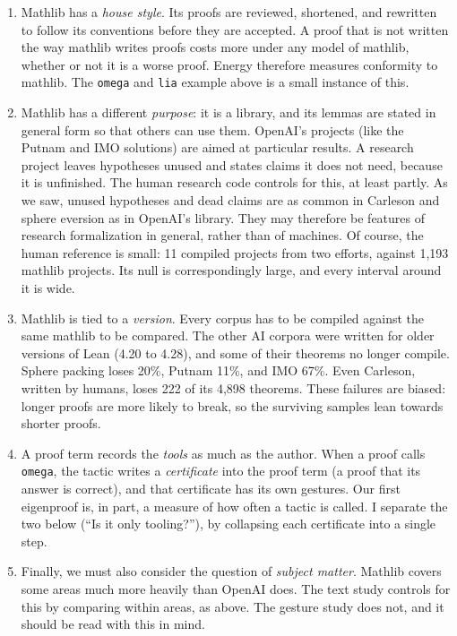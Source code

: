 \documentclass{article}
\begin{document}
\begin{enumerate}
     \item 
     Mathlib has a \textit{house style}. Its proofs are reviewed, shortened, and rewritten to follow its conventions
     before they are accepted. A proof that is not written the way mathlib writes proofs costs more under any model of
     mathlib, whether or not it is a worse proof. Energy therefore measures conformity to mathlib. 
     The \texttt{omega} and \texttt{lia} example above is a small instance of this.
     \item 
     Mathlib has a different \textit{purpose}: it is a library, and its lemmas are stated in general form so that others
     can use them. OpenAI's projects (like the Putnam and IMO solutions) are aimed at particular results. A research project
     leaves hypotheses unused and states claims it does not need, because it is unfinished.
     The human research code controls for this, at least partly. As we saw, unused hypotheses and dead claims are as common
     in Carleson and sphere eversion as in OpenAI's library. They may therefore be features of research formalization in
     general, rather than of machines. Of course, the human reference is small: 11 compiled projects from two efforts, against 1,193 mathlib
     projects. Its null is correspondingly large, and every interval around it is wide.
     \item
     Mathlib is tied to a \textit{version}. Every corpus has to be compiled against the same mathlib to be compared.
     The other AI corpora were written for older versions of Lean (4.20 to 4.28), and some of their theorems no longer
     compile. Sphere packing loses 20\%, Putnam 11\%, and IMO 67\%. Even Carleson, written by humans, loses 222 of its 4,898
     theorems. These failures are biased: longer proofs are more likely to break, so the surviving samples lean towards
     shorter proofs.
     \item
     A proof term records the \textit{tools} as much as the author. When a proof calls \texttt{omega}, the tactic
     writes a \textit{certificate} into the proof term (a proof that its answer is correct), and that certificate has
     its own gestures. Our first eigenproof is, in part, a measure of how often a tactic is called. I separate the two below (``Is it only
     tooling?''), by collapsing each certificate into a single step.
     \item
     Finally, we must also consider the question of \textit{subject matter}. Mathlib covers some areas much more heavily than OpenAI does. The text study controls
     for this by comparing within areas, as above. The gesture study does not, and it should be read with this in mind.
\end{enumerate}
\end{document}
